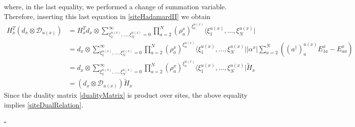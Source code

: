 \documentclass[10pt]{article}
\numberwithin{equation}{section}
\numberwithin{equation}{subsection}
\newcommand{\dd}{\mathcal{D}_{u(x)}}
\begin{document}
where, in the last equality, we performed a change of summation variable. Therefore, inserting this last equation in \eqref{siteHadamardII} we obtain 
\begin{equation}
    \begin{split}
H_{x}^{T}\left(d_{x}\otimes \dd\right)&=
     H_{x}^{T}d_{x}\otimes \sum_{\xi_{2}^{u(x)},\ldots,\xi_{N}^{u(x)}=0}^{\infty}\prod_{a=2}^{N}\left(\rho_{a}^{x}\right)^{\xi_{a}^{u(x)}}\langle \xi_{1}^{u(x)},\ldots,\xi_{N}^{u(x)}|
\\&=
d_{x}\otimes \sum_{\xi_{2}^{u(x)},\ldots,\xi_{N}^{u(x)}=0}^{\infty}\prod_{a=2}^{N}\left(\rho_{a}^{x}\right)^{\xi_{a}^{u(x)}}\langle \xi_{1}^{u(x)},\ldots,\xi_{N}^{u(x)}||\alpha^{x}|\sum_{a=2}^{N}\left((a^{\dagger})_{a}^{u(x)}E_{1a}^{x}-E_{aa}^{x}\right)   
\\&=
d_{x}\otimes \sum_{\xi_{2}^{u(x)},\ldots,\xi_{N}^{u(x)}=0}^{\infty}\prod_{a=2}^{N}\left(\rho_{a}^{x}\right)^{\xi_{a}^{u(x)}}\langle \xi_{1}^{u(x)},\ldots,\xi_{N}^{u(x)}|\widetilde{H}_{x}
\\&=
\left(d_{x}\otimes \dd\right)\widetilde{H}_{x}
    \end{split}
\end{equation}
Since the duality matrix \eqref{dualityMatrix} is product over sites, the above equality implies \eqref{siteDualRelation}. 
\begin{flushright}
$\square$
\end{flushright}
\end{document}
